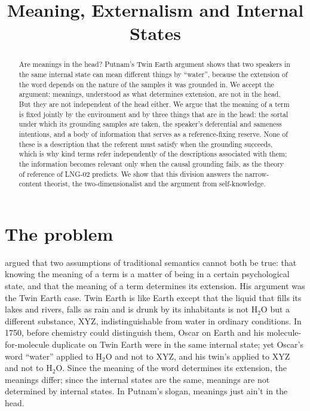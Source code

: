 \documentclass{situationist-preprint}
\title{Meaning, Externalism and Internal States}
\begin{document}
\maketitle

\begin{abstract}
Are meanings in the head? Putnam's Twin Earth argument shows that two speakers in the same internal state can mean different things by \enquote{water}, because the extension of the word depends on the nature of the samples it was grounded in. We accept the argument: meanings, understood as what determines extension, are not in the head. But they are not independent of the head either. We argue that the meaning of a term is fixed jointly by the environment and by three things that are in the head: the sortal under which its grounding samples are taken, the speaker's deferential and sameness intentions, and a body of information that serves as a reference-fixing reserve. None of these is a description that the referent must satisfy when the grounding succeeds, which is why kind terms refer independently of the descriptions associated with them; the information becomes relevant only when the causal grounding fails, as the theory of reference of LNG-02 predicts. We show that this division answers the narrow-content theorist, the two-dimensionalist and the argument from self-knowledge.
\end{abstract}

\section{The problem}

\citet{Putnam1975} argued that two assumptions of traditional semantics cannot both be true: that knowing the meaning of a term is a matter of being in a certain psychological state, and that the meaning of a term determines its extension. His argument was the Twin Earth case. Twin Earth is like Earth except that the liquid that fills its lakes and rivers, falls as rain and is drunk by its inhabitants is not H$_2$O but a different substance, XYZ, indistinguishable from water in ordinary conditions. In 1750, before chemistry could distinguish them, Oscar on Earth and his molecule-for-molecule duplicate on Twin Earth were in the same internal state; yet Oscar's word \enquote{water} applied to H$_2$O and not to XYZ, and his twin's applied to XYZ and not to H$_2$O. Since the meaning of the word determines its extension, the meanings differ; since the internal states are the same, meanings are not determined by internal states. In Putnam's slogan, meanings just ain't in the head.
\end{document}
